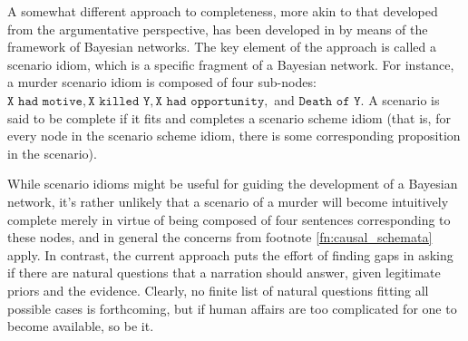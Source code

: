 \documentclass[10pt,leqno]{article}
\begin{document}
 A somewhat different approach to completeness, more akin to that developed from the argumentative perspective, has been developed in \citep{vlek2016method} by means of the framework of Bayesian networks. The key element of the approach is called a scenario idiom, which is a specific fragment of a Bayesian network. For instance, \citep[293]{vlek2016method} a murder scenario idiom is composed of four sub-nodes: $\mathtt{X \,\,had\,\, motive, X\,\, killed\,\, Y, X \,\, had\,\, opportunity,}$ and $\mathtt{Death \,\,of\,\, Y}$. A scenario is said to be complete if it fits and completes a scenario scheme idiom (that is, for every node in the scenario scheme idiom, there is some corresponding proposition in the scenario). 

 While scenario idioms might be useful for guiding the development of a Bayesian network, it's rather unlikely that a scenario of a murder will become intuitively complete merely in virtue of being composed of four sentences corresponding to these nodes, and in general the concerns from footnote \ref{fn:causal_schemata} apply. In contrast, the current approach puts the effort of finding gaps in  asking if there are natural questions that a narration should answer, given legitimate priors and the evidence. Clearly, no finite list of natural questions fitting all possible cases is forthcoming, but if human affairs are too complicated for one to become available, so be it.
\end{document}
